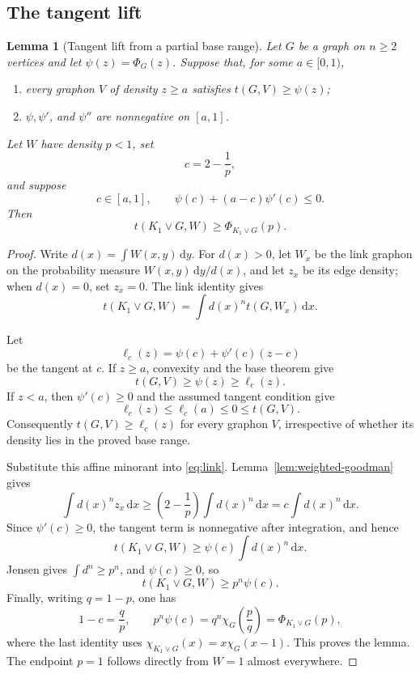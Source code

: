\documentclass[11pt]{article}
\newtheorem{lemma}[theorem]{Lemma}
\newcommand{\dd}{\,\mathrm d}
\begin{document}
\subsection{The tangent lift}

\begin{lemma}[Tangent lift from a partial base range]\label{lem:lift}
Let $G$ be a graph on $n\geq2$ vertices and let
$\psi(z)=\Phi_G(z)$.  Suppose that, for some $a\in[0,1)$,
\begin{enumerate}
 \item every graphon $V$ of density $z\geq a$ satisfies
       $t(G,V)\geq\psi(z)$;
 \item $\psi,\psi'$, and $\psi''$ are nonnegative on $[a,1]$.
\end{enumerate}
Let $W$ have density $p<1$, set
\[
 c=2-\frac1p,
\]
and suppose
\[
 c\in[a,1],
 \qquad
 \psi(c)+(a-c)\psi'(c)\leq0.
\]
Then
\[
 t(K_1\vee G,W)\geq\Phi_{K_1\vee G}(p).
\]
\end{lemma}

\begin{proof}
Write $d(x)=\int W(x,y)\dd y$.  For $d(x)>0$, let $W_x$ be the link
graphon on the probability measure $W(x,y)\dd y/d(x)$, and let $z_x$ be
its edge density; when $d(x)=0$, set $z_x=0$.  The link identity gives
\begin{equation}\label{eq:link}
 t(K_1\vee G,W)
 =\int d(x)^n t(G,W_x)\dd x.
\end{equation}

Let
\[
 \ell_c(z)=\psi(c)+\psi'(c)(z-c)
\]
be the tangent at $c$.  If $z\geq a$, convexity and the base theorem give
\[
 t(G,V)\geq\psi(z)\geq\ell_c(z).
\]
If $z<a$, then $\psi'(c)\geq0$ and the assumed tangent condition give
\[
 \ell_c(z)\leq\ell_c(a)\leq0\leq t(G,V).
\]
Consequently $t(G,V)\geq\ell_c(z)$ for every graphon $V$, irrespective of
whether its density lies in the proved base range.

Substitute this affine minorant into \eqref{eq:link}.
Lemma~\ref{lem:weighted-goodman} gives
\[
 \int d(x)^n z_x\dd x
 \geq
 \left(2-\frac1p\right)\int d(x)^n\dd x
 =c\int d(x)^n\dd x.
\]
Since $\psi'(c)\geq0$, the tangent term is nonnegative after integration,
and hence
\[
 t(K_1\vee G,W)
 \geq
 \psi(c)\int d(x)^n\dd x.
\]
Jensen gives $\int d^n\geq p^n$, and $\psi(c)\geq0$, so
\[
 t(K_1\vee G,W)\geq p^n\psi(c).
\]
Finally, writing $q=1-p$, one has
\[
 1-c=\frac qp,
 \qquad
 p^n\psi(c)=q^n\chi_G\!\left(\frac pq\right)
 =\Phi_{K_1\vee G}(p),
\]
where the last identity uses
$\chi_{K_1\vee G}(x)=x\chi_G(x-1)$.  This proves the lemma.  The endpoint
$p=1$ follows directly from $W=1$ almost everywhere.
\end{proof}
\end{document}
